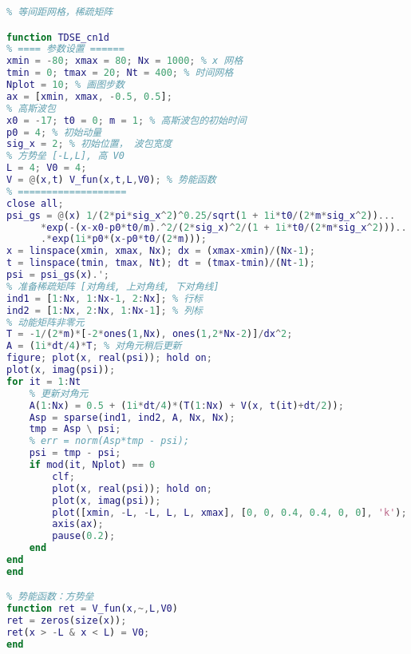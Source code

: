 \begin{lstlisting}[language=matlab, caption=TDSE\_cn1d.m]
% Crank-Nicolson 法解一维薛定谔方程
% 等间距网格，稀疏矩阵

function TDSE_cn1d
% ==== 参数设置 ======
xmin = -80; xmax = 80; Nx = 1000; % x 网格
tmin = 0; tmax = 20; Nt = 400; % 时间网格
Nplot = 10; % 画图步数
ax = [xmin, xmax, -0.5, 0.5];
% 高斯波包
x0 = -17; t0 = 0; m = 1; % 高斯波包的初始时间
p0 = 4; % 初始动量
sig_x = 2; % 初始位置， 波包宽度
% 方势垒 [-L,L], 高 V0
L = 4; V0 = 4;
V = @(x,t) V_fun(x,t,L,V0); % 势能函数
% ===================
close all;
psi_gs = @(x) 1/(2*pi*sig_x^2)^0.25/sqrt(1 + 1i*t0/(2*m*sig_x^2))...
      *exp(-(x-x0-p0*t0/m).^2/(2*sig_x)^2/(1 + 1i*t0/(2*m*sig_x^2)))...
      .*exp(1i*p0*(x-p0*t0/(2*m)));
x = linspace(xmin, xmax, Nx); dx = (xmax-xmin)/(Nx-1);
t = linspace(tmin, tmax, Nt); dt = (tmax-tmin)/(Nt-1);
psi = psi_gs(x).';
% 准备稀疏矩阵 [对角线, 上对角线, 下对角线]
ind1 = [1:Nx, 1:Nx-1, 2:Nx]; % 行标
ind2 = [1:Nx, 2:Nx, 1:Nx-1]; % 列标
% 动能矩阵非零元
T = -1/(2*m)*[-2*ones(1,Nx), ones(1,2*Nx-2)]/dx^2;
A = (1i*dt/4)*T; % 对角元稍后更新
figure; plot(x, real(psi)); hold on;
plot(x, imag(psi));
for it = 1:Nt
    % 更新对角元
    A(1:Nx) = 0.5 + (1i*dt/4)*(T(1:Nx) + V(x, t(it)+dt/2));
    Asp = sparse(ind1, ind2, A, Nx, Nx);
    tmp = Asp \ psi;
    % err = norm(Asp*tmp - psi);
    psi = tmp - psi;
    if mod(it, Nplot) == 0
        clf;
        plot(x, real(psi)); hold on;
        plot(x, imag(psi));
        plot([xmin, -L, -L, L, L, xmax], [0, 0, 0.4, 0.4, 0, 0], 'k');
        axis(ax);
        pause(0.2);
    end
end
end

% 势能函数：方势垒
function ret = V_fun(x,~,L,V0)
ret = zeros(size(x));
ret(x > -L & x < L) = V0;
end
\end{lstlisting}

